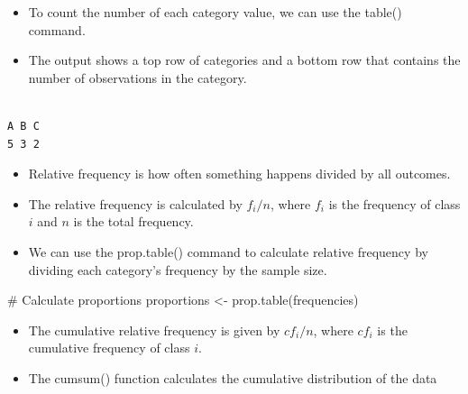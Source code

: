 \documentclass[
  letterpaper,
  DIV=11,
  numbers=noendperiod]{scrreprt}
\newenvironment{Shaded}{\begin{snugshade}}{\end{snugshade}}
\newcommand{\CommentTok}[1]{\textcolor[rgb]{0.37,0.37,0.37}{#1}}
\newcommand{\FunctionTok}[1]{\textcolor[rgb]{0.28,0.35,0.67}{#1}}
\newcommand{\NormalTok}[1]{\textcolor[rgb]{0.00,0.23,0.31}{#1}}
\newcommand{\OtherTok}[1]{\textcolor[rgb]{0.00,0.23,0.31}{#1}}
\newcommand{\SpecialCharTok}[1]{\textcolor[rgb]{0.37,0.37,0.37}{#1}}
\providecommand{\tightlist}{%
  \setlength{\itemsep}{0pt}\setlength{\parskip}{0pt}}\usepackage{longtable,booktabs,array}
\begin{document}
\begin{itemize}
\tightlist
\item
  To count the number of each category value, we can use the table()
  command.
\item
  The output shows a top row of categories and a bottom row that
  contains the number of observations in the category.
\end{itemize}

\begin{Shaded}
\end{Shaded}

\begin{verbatim}

A B C 
5 3 2 
\end{verbatim}

\begin{itemize}
\tightlist
\item
  Relative frequency is how often something happens divided by all
  outcomes.
\item
  The relative frequency is calculated by \(f_i/n\), where \(f_i\) is
  the frequency of class \(i\) and \(n\) is the total frequency.
\item
  We can use the prop.table() command to calculate relative frequency by
  dividing each category's frequency by the sample size.
\end{itemize}

\begin{Shaded}
\begin{Highlighting}[]
\CommentTok{\# Calculate proportions}
\NormalTok{proportions }\OtherTok{\textless{}{-}} \FunctionTok{prop.table}\NormalTok{(frequencies)}
\end{Highlighting}
\end{Shaded}

\begin{itemize}
\tightlist
\item
  The cumulative relative frequency is given by \(cf_i/n\), where
  \(cf_i\) is the cumulative frequency of class \(i\).
\item
  The cumsum() function calculates the cumulative distribution of the
  data
\end{itemize}
\end{document}
